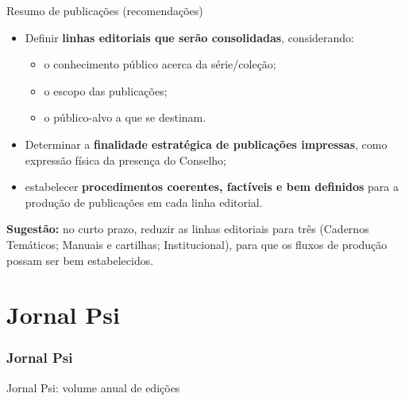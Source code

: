\documentclass{beamer}
\begin{document}
\begin{frame}{Resumo de publicações (recomendações)}

	\scriptsize
	\begin{itemize}
	\item Definir \textbf{linhas editoriais que serão consolidadas}, considerando:
		\begin{itemize}\scriptsize
			\item o conhecimento público acerca da série/coleção;
			\item o escopo das publicações;
			\item o público-alvo a que se destinam.
		\end{itemize}
	\item Determinar a \textbf{finalidade estratégica de publicações impressas}, como expressão física da presença do Conselho;
	\item estabelecer \textbf{procedimentos coerentes, factíveis e bem definidos} para a produção de publicações em cada linha editorial.
	\end{itemize}

\scriptsize
	\textbf{Sugestão:} no curto prazo, reduzir as linhas editoriais para três (Cadernos Temáticos; Manuais e cartilhas; Institucional), para que os fluxos de produção possam ser bem estabelecidos.
\end{frame}

\part{Jornal Psi}

\section{Jornal Psi}
		\begin{frame}[fragile]{Jornal Psi: volume anual de edições}
	\end{frame}
\end{document}
